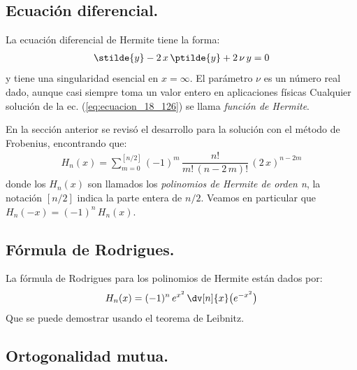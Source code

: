\subsection{Ecuación diferencial.}

La ecuación diferencial de Hermite tiene la forma:
\begin{align}
\stilde{y} -  2 \, x \, \ptilde{y} + 2 \, \nu \, y = 0
\label{eq:ecuacion_18_126}
\end{align}
y tiene una singularidad esencial en $x = \infty$. El parámetro $\nu$ es un número real dado, aunque casi siempre toma un valor entero en aplicaciones físicas Cualquier solución de la ec. (\ref{eq:ecuacion_18_126}) se llama \emph{función de Hermite}.
\par
En la sección anterior se revisó el desarrollo para la solución con el método de Frobenius, encontrando que:
\begin{align}
H_{n}(x) = \sum_{m=0}^{[n/2]} (-1)^{m} \, \dfrac{n!}{m! \, (n - 2 \, m)!} \, (2 \, x)^{n-2m}
\label{eq:ecuacion_18_129}
\end{align}
donde los $H_{n}(x)$ son llamados los \emph{polinomios de Hermite de orden n}, la notación $[n/2]$ indica la parte entera de $n/2$. Veamos en particular que $H_{n}(-x) = (-1)^{n} \, H_{n}(x)$.

\subsection{Fórmula de Rodrigues.}

La fórmula de Rodrigues para los polinomios de Hermite están dados por:
\begin{align}
H_{n}(x) = (-1)^{n} \, e^{x^{2}} \, \dv[n]{x} \big( e^{-x^{2}} \big)
\label{eq:ecuacion_18_130}
\end{align}
Que se puede demostrar usando el teorema de Leibnitz.

\subsection{Ortogonalidad mutua.}


